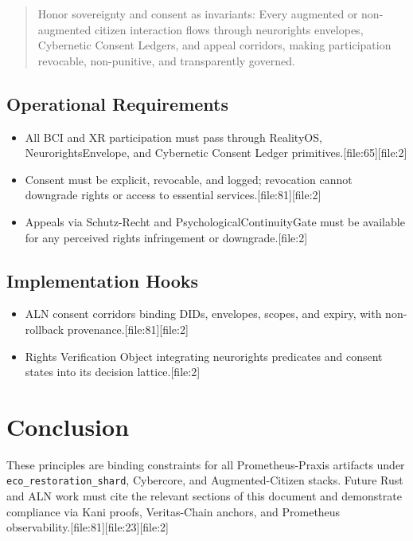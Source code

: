 \documentclass[11pt]{article}
\begin{document}
\begin{quote}
Honor sovereignty and consent as invariants: Every augmented or non-augmented citizen interaction flows through neurorights envelopes, Cybernetic Consent Ledgers, and appeal corridors, making participation revocable, non-punitive, and transparently governed.
\end{quote}

\subsection{Operational Requirements}

\begin{itemize}[nosep]
  \item All BCI and XR participation must pass through RealityOS, NeurorightsEnvelope, and Cybernetic Consent Ledger primitives.[file:65][file:2]
  \item Consent must be explicit, revocable, and logged; revocation cannot downgrade rights or access to essential services.[file:81][file:2]
  \item Appeals via Schutz-Recht and PsychologicalContinuityGate must be available for any perceived rights infringement or downgrade.[file:2]
\end{itemize}

\subsection{Implementation Hooks}

\begin{itemize}[nosep]
  \item ALN consent corridors binding DIDs, envelopes, scopes, and expiry, with non-rollback provenance.[file:81][file:2]
  \item Rights Verification Object integrating neurorights predicates and consent states into its decision lattice.[file:2]
\end{itemize}

\section{Conclusion}

These principles are binding constraints for all Prometheus-Praxis artifacts under \texttt{eco\_restoration\_shard}, Cybercore, and Augmented-Citizen stacks.
Future Rust and ALN work must cite the relevant sections of this document and demonstrate compliance via Kani proofs, Veritas-Chain anchors, and Prometheus observability.[file:81][file:23][file:2]
\end{document}
